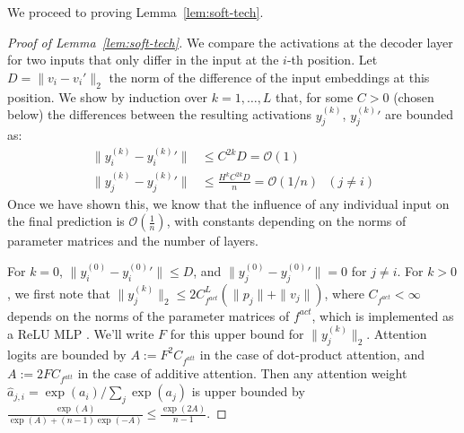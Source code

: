 \documentclass[11pt,a4paper]{article}
\newcounter{theorem}
\begin{document}
We proceed to proving Lemma~\ref{lem:soft-tech}.
\begin{proof}[Proof of Lemma~\ref{lem:soft-tech}]
We compare the activations at the decoder layer for two inputs that only differ in the input at the $i$-th position.
Let $D = \|v_i-v_i'\|_2$ the norm of the difference of the input embeddings at this position.
	We show by induction over $k = 1, \dots, L$ that, for some $C > 0$ (chosen below) the differences between the resulting activations $y_j^{(k)}$, ${y_j^{(k)}}'$ are bounded as:
\begin{align*}
	\|y_i^{(k)}-{y_i^{(k)}}'\| &\leq C^{2k}D = \mathcal{O}(1) \\
	\|y_j^{(k)}-{y_j^{(k)}}'\| &\leq \frac{H^k C^{2k}D}{n} = \mathcal{O}(1/n)\ \ \ (j \neq i)
	\end{align*}
Once we have shown this, we know that the influence of any individual input on the final prediction is $\mathcal{O}(\frac{1}{n})$, with constants depending on the norms of parameter matrices and the number of layers.


For $k=0$, $\|y_i^{(0)} - {y_i^{(0)}}'\| \leq D$, %
and %
$\|y_j^{(0)} - {y_j^{(0)}}'\| = 0$ for $j \neq i$.
For $k>0$, we first note that $\|y_j^{(k)}\|_2 \leq 2 C_{f^{act}}^{L}  (\|p_j\| + \|v_j\|)$,
where $C_{f^{act}} < \infty$ depends on the norms of the parameter matrices of $f^{act}$, which is implemented as a ReLU MLP \cite{vaswani2017attention}.
We'll write $F$ for this upper bound for $\|y_j^{(k)}\|_2$.
Attention logits are bounded by $A := F^2 C_{f^{att}}$ in the case of dot-product attention, and $A := 2 F C_{f^{att}}$ in the case of additive attention.
Then any attention weight $\widehat{a}_{j,i} = \exp(a_i)/\sum_j \exp(a_j)$ is upper bounded by $\frac{\exp(A)}{\exp(A) + (n-1) \exp(-A)} \leq \frac{\exp(2A)}{n-1}$.


\end{proof}
\end{document}
